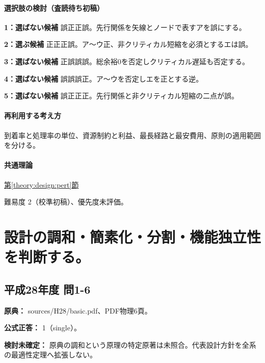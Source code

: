 \paragraph{選択肢の検討（査読待ち初稿）}\mbox{}\par

\noindent\textbf{1：選ばない候補} 誤正正誤。先行関係を矢線とノードで表すアを誤にする。\par

\noindent\textbf{2：選ぶ候補} 正正正誤。ア〜ウ正、非クリティカル短縮を必須とするエは誤。\par

\noindent\textbf{3：選ばない候補} 正誤誤誤。総余裕0を否定しクリティカル遅延も否定する。\par

\noindent\textbf{4：選ばない候補} 誤誤誤正。ア〜ウを否定しエを正とする逆。\par

\noindent\textbf{5：選ばない候補} 誤正正正。先行関係と非クリティカル短縮の二点が誤。\par

\paragraph{再利用する考え方} 到着率と処理率の単位、資源制約と利益、最長経路と最安費用、原則の適用範囲を分ける。

\paragraph{共通理論} \hyperref[theory:design:pert]{第\ref*{theory:design:pert}節}

\par 難易度 2（校準初稿）、優先度未評価。

\section{設計の調和・簡素化・分割・機能独立性を判断する。}

\subsection{平成28年度 問1-6}
\label{q:h28-reg-basic-1-6}

\noindent\textbf{原典：} sources/H28/basic.pdf、PDF物理6頁。

\textbf{公式正答：} 1（single）。

\par\textbf{検討未確定：} 原典の調和という原理の特定原著は未照合。代表設計方針を全系の最適性定理へ拡張しない。

